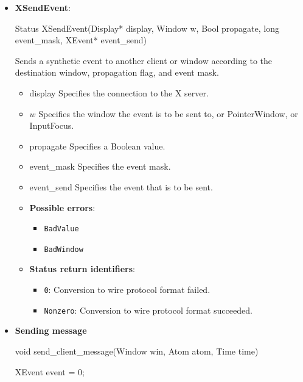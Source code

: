 \documentclass{report}
\begin{document}
\begin{itemize}
\begin{itemize}
            \end{itemize}
            \textbf{Note:} The important protocols are 
            \begin{itemize}
                \item \textbf{WM\_TAKE\_FOCUS}
                \item \textbf{WM\_DELETE\_WINDOW}
            \end{itemize}
        \item \textbf{XSendEvent}:
            \bigbreak \noindent 
            \begin{cppcode}
                Status XSendEvent(Display* display, Window w, Bool propagate, long event_mask, XEvent* event_send)
            \end{cppcode}
            \bigbreak \noindent
            Sends a synthetic event to another client or window according to the destination window, propagation flag, and event mask.
            \begin{itemize}
                \item display Specifies the connection to the X server.
                \item $w$ Specifies the window the event is to be sent to, or PointerWindow, or InputFocus.
                \item propagate Specifies a Boolean value.
                \item event\_mask Specifies the event mask.
                \item event\_send Specifies the event that is to be sent.
            \end{itemize}
            \begin{itemize}
                \item \textbf{Possible errors}:
                    \begin{itemize}
                        \item \texttt{BadValue}
                        \item \texttt{BadWindow}
                    \end{itemize}
                \item \textbf{Status return identifiers}:
                    \begin{itemize}
                        \item \texttt{0}: Conversion to wire protocol format failed.
                        \item \texttt{Nonzero}: Conversion to wire protocol format succeeded.
                    \end{itemize}
            \end{itemize}
        \item \textbf{Sending message}
            \bigbreak \noindent 
            \begin{cppcode}
                void send_client_message(Window win, Atom atom, Time time) {
                    XEvent event = {0};

}
\end{cppcode}
\end{itemize}
\end{document}
